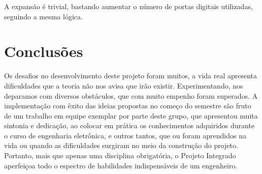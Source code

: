 \documentclass[a4paper,12pt]{report}
\begin{document}
	A expansão é trivial, bastando aumentar o número de portas digitais utilizadas, seguindo a mesma lógica.

\cleardoublepage
\chapter{Conclusões}
	\label{cap:Conclusoes}
 	Os desafios no desenvolvimento deste projeto foram muitos, a vida real apresenta dificuldades que a teoria não nos avisa que irão existir. Experimentando, nos deparamos com diversos obstáculos, que com muito empenho foram superados. A implementação com êxito das ideias propostas no começo do semestre são fruto de um trabalho em equipe exemplar por parte deste grupo, que apresentou muita sintonia e dedicação, ao colocar em prática os conhecimentos adquiridos durante o curso de engenharia eletrônica, e outros tantos, que ou foram aprendidos na vida ou quando as dificuldades surgiram no meio da construção do projeto. Portanto, mais que apenas uma disciplina obrigatória, o Projeto Integrado aperfeiçoa todo o espectro de habilidades indispensáveis de um engenheiro. 
 
 
 
%
%	
	
	
	
	
	
	
	
	
	
	
	
		
	
	
	
\end{document}
